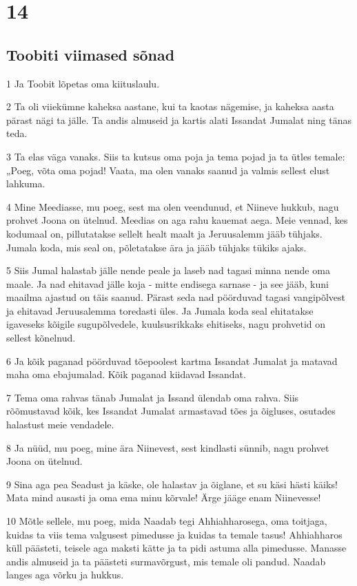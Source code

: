 \chapter{14}

\section*{Toobiti viimased sõnad}

\par 1 Ja Toobit lõpetas oma kiituslaulu.
\par 2 Ta oli viiekümne kaheksa aastane, kui ta kaotas nägemise, ja  kaheksa aasta pärast nägi ta jälle. Ta andis almuseid ja kartis alati  Issandat Jumalat ning tänas teda.
\par 3 Ta elas väga vanaks. Siis ta kutsus oma poja ja tema pojad ja ta  ütles temale: „Poeg, võta oma pojad! Vaata, ma olen vanaks saanud ja  valmis sellest elust lahkuma.
\par 4 Mine Meediasse, mu poeg, sest ma olen veendunud, et Niineve  hukkub, nagu prohvet Joona on ütelnud. Meedias on aga rahu kauemat  aega. Meie vennad, kes kodumaal on, pillutatakse sellelt healt maalt ja  Jeruusalemm jääb tühjaks. Jumala koda, mis seal on, põletatakse ära ja  jääb tühjaks tükiks ajaks.
\par 5 Siis Jumal halastab jälle nende peale ja laseb nad tagasi minna  nende oma maale. Ja nad ehitavad jälle koja - mitte endisega sarnase - ja  see jääb, kuni maailma ajastud on täis saanud. Pärast seda nad pöörduvad  tagasi vangipõlvest ja ehitavad Jeruusalemma toredasti üles. Ja Jumala  koda seal ehitatakse igaveseks kõigile sugupõlvedele, kuulsusrikkaks  ehitiseks, nagu prohvetid on sellest kõnelnud.
\par 6 Ja kõik paganad pöörduvad tõepoolest kartma Issandat Jumalat ja  matavad maha oma ebajumalad. Kõik paganad kiidavad Issandat.
\par 7 Tema oma rahvas tänab Jumalat ja Issand ülendab oma rahva. Siis  rõõmustavad kõik, kes Issandat Jumalat armastavad tões ja õigluses,  osutades halastust meie vendadele.
\par 8 Ja nüüd, mu poeg, mine ära Niinevest, sest kindlasti sünnib, nagu  prohvet Joona on ütelnud.
\par 9 Sina aga pea Seadust ja käske, ole halastav ja õiglane, et su  käsi hästi käiks! Mata mind ausasti ja oma ema minu kõrvale! Ärge  jääge enam Niinevesse!
\par 10 Mõtle sellele, mu poeg, mida Naadab tegi Ahhiahharosega, oma  toitjaga, kuidas ta viis tema valgusest pimedusse ja kuidas ta temale  tasus! Ahhiahharos küll päästeti, teisele aga maksti kätte ja ta pidi  astuma alla pimedusse. Manasse andis almuseid ja ta päästeti  surmavõrgust, mis temale oli pandud. Naadab langes aga võrku ja  hukkus.
